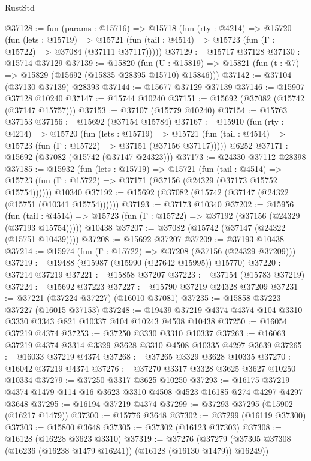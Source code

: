 \begin{lexlean}{RustStd}
\begin{coremodule}
@37128 := fun (params : @15716) =>
  @15718
    (fun (rty : @4214) =>
    @15720
      (fun (lets : @15719) =>
      @15721 (fun (tail : @4514) => @15723 (fun (Γ : @15722) => @37084 (@37111 @37117)))))
@37129 := @15717 @37128
@37130 := @15714 @37129
@37139 := @15820
    (fun (U : @15819) => @15821 (fun (t : @7) => @15829 (@15692 (@15835 @28395 @15710) @15846)))
@37142 := @37104 (@37130 @37139) @28393
@37144 := @15677 @37129 @37139
@37146 := @15907 @37128 @10240
@37147 := @15744 @10240
@37151 := @15692 (@37082 (@15742 (@37147 @15757)))
@37153 := @37107 (@15779 @10240)
@37154 := @15763 @37153
@37156 := @15692 (@37154 @15784)
@37167 := @15910
    (fun (rty : @4214) =>
    @15720
      (fun (lets : @15719) =>
      @15721 (fun (tail : @4514) => @15723 (fun (Γ : @15722) => @37151 (@37156 @37117)))))
    @6252
@37171 := @15692 (@37082 (@15742 (@37147 @24323)))
@37173 := @24330 @37112 @28398
@37185 := @15932
    (fun (lets : @15719) =>
    @15721
      (fun (tail : @4514) =>
      @15723 (fun (Γ : @15722) => @37171 (@37156 (@24329 (@37173 @15752 @15754))))))
    @10340
@37192 := @15692 (@37082 (@15742 (@37147 (@24322 (@15751 (@10341 @15754))))))
@37193 := @37173 @10340
@37202 := @15956
    (fun (tail : @4514) => @15723 (fun (Γ : @15722) => @37192 (@37156 (@24329 (@37193 @15754)))))
    @10438
@37207 := @37082 (@15742 (@37147 (@24322 (@15751 @10439))))
@37208 := @15692 @37207
@37209 := @37193 @10438
@37214 := @15974 (fun (Γ : @15722) => @37208 (@37156 (@24329 @37209)))
@37219 := @19488 (@15987 (@15990 (@27642 @15995)) @15770)
@37220 := @37214 @37219
@37221 := @15858 @37207
@37223 := @37154 (@15783 @37219)
@37224 := @15692 @37223
@37227 := @15790 @37219 @24328 @37209
@37231 := @37221 (@37224 @37227) (@16010 @37081)
@37235 := @15858 @37223 @37227 (@16015 @37153)
@37248 := @19439 @37219 @4374 @4374 @104 @3310 @3330 @3343 @821 @10337 @104 @10243 @4508 @10438
@37250 := @16054 @37219 @4374
@37253 := @37250 @3330 @3310 @10337
@37263 := @16063 @37219 @4374 @3314 @3329 @3628 @3310 @4508 @10335 @4297 @3639
@37265 := @16033 @37219 @4374
@37268 := @37265 @3329 @3628 @10335
@37270 := @16042 @37219 @4374
@37276 := @37270 @3317 @3328 @3625 @3627 @10250 @10334
@37279 := @37250 @3317 @3625 @10250
@37293 := @16175 @37219 @4374 @1479 @114 @16 @3623 @3310 @4508 @4523 @16185 @274 @4297 @4297 @3648
@37295 := @16194 @37219 @4374
@37299 := @37293 @37295 (@15902 (@16217 @1479))
@37300 := @15776 @3648
@37302 := @37299 (@16119 @37300)
@37303 := @15800 @3648
@37305 := @37302 (@16123 @37303)
@37308 := @16128 (@16228 @3623 @3310)
@37319 := @37276
    (@37279 (@37305 @37308 (@16236 (@16238 @1479 @16241)) (@16128 (@16130 @1479)) @16249))

\end{coremodule}
\end{lexlean}
